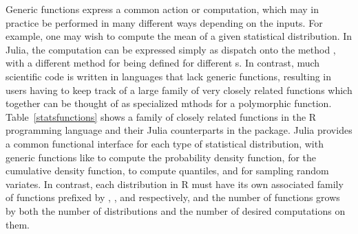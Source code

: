 Generic functions express a common action or computation, which may in
practice be performed in many different ways depending on the inputs. For
example, one may wish to compute the mean of a given statistical distribution.
In Julia, the computation can be expressed simply as dispatch onto the method
, with a different method for  being
defined for different s. In contrast, much scientific code
is written in languages that lack generic functions, resulting in users having
to keep track of a large family of very closely related functions which
together can be thought of as specialized mthods for a polymorphic function.
Table~\ref{statsfunctions} shows a family of closely related functions in the R
programming language and their Julia counterparts in the
 package. Julia provides a common functional interface
for each type of statistical distribution, with generic functions like
 to compute the probability density function,  for the
cumulative density function,  to compute quantiles, and
 for sampling random variates. In contrast, each distribution in R
must have its own associated family of functions prefixed by ,
,  and  respectively, and the number of functions grows
by both the number of distributions and the number of desired computations on
them.


